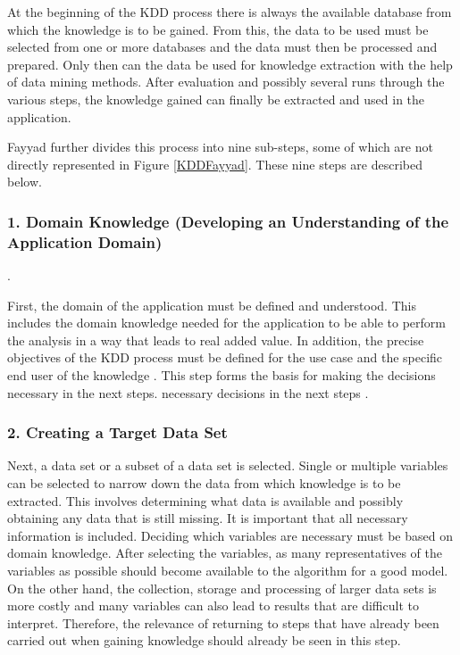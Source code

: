 


At the beginning of the KDD process there is always the available database from which the knowledge is to be gained. From this, the data to be used must be selected from one or more databases and the data must then be processed and prepared. Only then can the data be used for knowledge extraction with the help of data mining methods. After evaluation and possibly several runs through the various steps, the knowledge gained can finally be extracted and used in the application.

Fayyad further divides this process into nine sub-steps, some of which are not directly represented in Figure \ref{KDDFayyad}. These nine steps are described below.

\subsubsection{1. Domain Knowledge (Developing an Understanding of the Application Domain)}.

First, the domain of the application must be defined and understood. This includes the domain knowledge needed for the application to be able to perform the analysis in a way that leads to real added value. In addition, the precise objectives of the KDD process must be defined for the use case and the specific end user of the knowledge \cite{Fayyad:1996,Kurgan:2006}. This step forms the basis for making the decisions necessary in the next steps. 
necessary decisions in the next steps \cite{Maimon:2010}.

\subsubsection{2. Creating a Target Data Set}

Next, a data set or a subset of a data set is selected. Single or multiple variables can be selected to narrow down the data from which knowledge is to be extracted. \cite{Fayyad:1996} This involves determining what data is available and possibly obtaining any data that is still missing. It is important that all necessary information is included. Deciding which variables are necessary must be based on domain knowledge. After selecting the variables, as many representatives of the variables as possible should become available to the algorithm for a good model. On the other hand, the collection, storage and processing of larger data sets is more costly and many variables can also lead to results that are difficult to interpret. Therefore, the relevance of returning to steps that have already been carried out when gaining knowledge should already be seen in this step.\cite{Maimon:2010}

